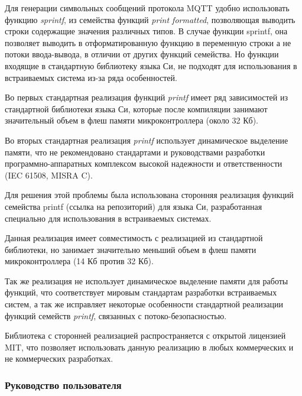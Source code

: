 Для генерации символьных сообщений протокола MQTT удобно использовать
функцию \emph{sprintf}, из семейства функций \emph{print formatted},
позволяющая выводить строки содержащие значения различных типов. В
случае функции sprintf, она позволяет выводить в отформатированную
функцию в переменную строки а не потоки ввода-вывода, в отличии от
других функций семейства. Но функции входящие в стандартную библиотеку
языка Си, не подходят для использования в встраиваемых система из-за
ряда особенностей.

Во первых стандартная реализация функций \emph{printf} имеет ряд
зависимостей из стандартной библиотеки языка Си, которые после
компиляции занимают значительный объем в флеш памяти микроконтроллера
(около 32 Кб).

Во вторых стандартная реализация \emph{printf} использует динамическое
выделение памяти, что не рекомендовано стандартами и руководствами
разработки программно-аппаратных комплексом высокой надежности и
ответственности (IEC 61508, MISRA C).

Для решения этой проблемы была использована сторонняя реализация функций
семейства printf (ссылка на репозиторий) для языка Си, разработанная
специально для использования в встраиваемых системах.

Данная реализация имеет совместимость с реализацией из стандартной
библиотеки, но занимает значительно меньший объем в флеш памяти
микроконтроллера (14 Кб против 32 Кб).

Так же реализация не использует динамическое выделение памяти для работы
функций, что соответствует мировым стандартам разработки встраиваемых
систем, а так же исправляет некоторые особенности стандартной реализации
функций семейств \emph{printf}, связанных с потоко-безопасностью.

Библиотека с сторонней реализацией распространяется с открытой лицензией
MIT, что позволяет использовать данную реализацию в любых коммерческих и
не коммерческих разработках.

\hypertarget{ux440ux443ux43aux43eux432ux43eux434ux441ux442ux432ux43e-ux43fux43eux43bux44cux437ux43eux432ux430ux442ux435ux43bux44f}{%
\subsubsection{Руководство
пользователя}\label{ux440ux443ux43aux43eux432ux43eux434ux441ux442ux432ux43e-ux43fux43eux43bux44cux437ux43eux432ux430ux442ux435ux43bux44f}}

